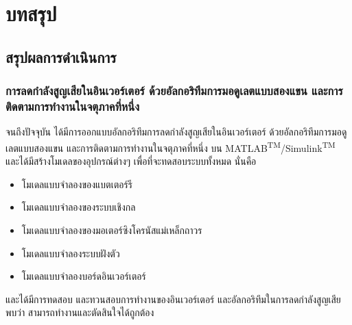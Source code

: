 \documentclass[11pt,a4paper]{article}
\begin{document}
\newpage
\section{บทสรุป}
\subsection{สรุปผลการดำเนินการ}

\subsubsection{การลดกำลังสูญเสียในอินเวอร์เตอร์ ด้วยอัลกอริทึมการมอดูเลตแบบสองแขน และการติดตามการทำงานในจตุภาคที่หนึ่ง}

จนถึงปัจจุบัน ได้มีการออกแบบอัลกอริทึมการลดกำลังสูญเสียในอินเวอร์เตอร์ ด้วยอัลกอริทึมการมอดูเลตแบบสองแขน และการติดตามการทำงานในจตุภาคที่หนึ่ง บน MATLAB\textsuperscript{TM}/Simulink\textsuperscript{TM} และได้มีสร้างโมเดลของอุปกรณ์ต่างๆ เพื่อที่จะทดสอบระบบทั้งหมด นั่นคือ

\begin{itemize}
    \item โมเดลแบบจำลองของแบตเตอร์รี
    \item โมเดลแบบจำลองของระบบเชิงกล
    \item โมเดลแบบจำลองของมอเตอร์ซิงโครนัสแม่เหล็กถาวร
    \item โมเดลแบบจำลองระบบฝังตัว
    \item โมเดลแบบจำลองบอร์ดอินเวอร์เตอร์
\end{itemize}

และได้มีการทดสอบ และทวนสอบการทำงานของอินเวอร์เตอร์ และอัลกอริทึมในการลดกำลังสูญเสีย พบว่า สามารถทำงานและตัดสินใจได้ถูกต้อง
\end{document}
